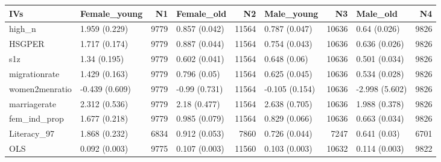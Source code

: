 \documentclass[a4paper,12pt,twoside]{book}
\begin{document}
\begin{table}[ht]
	\centering
	\begin{tabular}{llrlrlrlr}
		\hline
		IVs & Female\_young & N1 & Female\_old & N2 & Male\_young & N3 & Male\_old & N4 \\ 
		\hline
		high\_n & 1.959 (0.229) & 9779 & 0.857 (0.042) & 11564 & 0.787 (0.047) & 10636 & 0.64 (0.026) & 9826 \\ 
		HSGPER & 1.717 (0.174) & 9779 & 0.887 (0.044) & 11564 & 0.754 (0.043) & 10636 & 0.636 (0.026) & 9826 \\ 
		s1z & 1.34 (0.195) & 9779 & 0.602 (0.041) & 11564 & 0.648 (0.06) & 10636 & 0.501 (0.034) & 9826 \\ 
		migrationrate & 1.429 (0.163) & 9779 & 0.796 (0.05) & 11564 & 0.625 (0.045) & 10636 & 0.534 (0.028) & 9826 \\ 
		women2menratio & -0.439 (0.609) & 9779 & -0.99 (0.731) & 11564 & -0.105 (0.154) & 10636 & -2.998 (5.602) & 9826 \\ 
		marriagerate & 2.312 (0.536) & 9779 & 2.18 (0.477) & 11564 & 2.638 (0.705) & 10636 & 1.988 (0.378) & 9826 \\ 
		fem\_ind\_prop & 1.677 (0.218) & 9779 & 0.985 (0.079) & 11564 & 0.829 (0.066) & 10636 & 0.663 (0.034) & 9826 \\ 
		Literacy\_97 & 1.868 (0.232) & 6834 & 0.912 (0.053) & 7860 & 0.726 (0.044) & 7247 & 0.641 (0.03) & 6701 \\ 
		OLS & 0.092 (0.003) & 9775 & 0.107 (0.003) & 11560 & 0.103 (0.003) & 10632 & 0.114 (0.003) & 9822 \\ 
		\hline
	\end{tabular}
\end{table}
\end{document}
